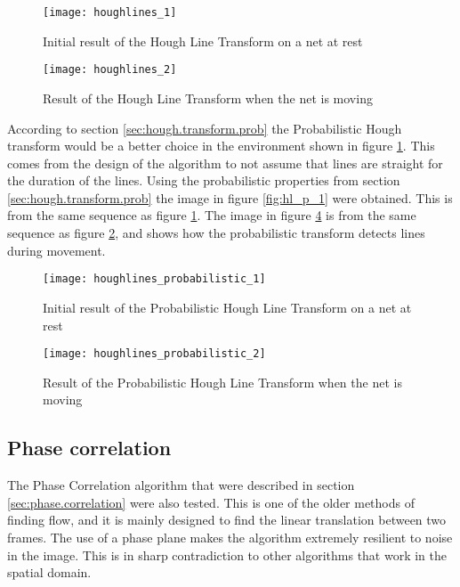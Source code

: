 \begin{figure}[htbp]
	\centering
	\texttt{[image: houghlines\_1]}
	\caption{Initial result of the Hough Line Transform on a net at rest}
	\label{fig:hl_1}
\end{figure}

\begin{figure}[htbp]
	\centering
	\texttt{[image: houghlines\_2]}
	\caption{Result of the Hough Line Transform when the net is moving}
	\label{fig:hl_2}
\end{figure}

According to section \vref{sec:hough.transform.prob} the Probabilistic Hough transform would be a better choice in the
environment shown in figure \ref{fig:hl_1}. This comes from the design of the algorithm to not 
assume that lines are straight for the duration of the lines. Using the probabilistic properties from section \ref{sec:hough.transform.prob} 
the image in figure \vref{fig:hl_p_1} were obtained. This is from the same sequence as figure \ref{fig:hl_1}. The image in figure \ref{fig:hl_p_2}
is from the same sequence as figure \ref{fig:hl_2}, and shows how the probabilistic transform detects lines during movement.

\begin{figure}[htbp]
	\centering
	\texttt{[image: houghlines\_probabilistic\_1]}
	\caption{Initial result of the Probabilistic Hough Line Transform on a net at rest}
	\label{fig:hl_p_1}
\end{figure}

\begin{figure}[htbp]
	\centering
	\texttt{[image: houghlines\_probabilistic\_2]}
	\caption{Result of the Probabilistic Hough Line Transform when the net is moving}
	\label{fig:hl_p_2}
\end{figure}

\clearpage

\subsection{Phase correlation}
The Phase Correlation algorithm that were described in section \vref{sec:phase.correlation} were also tested. This 
is one of the older methods of finding flow, and it is mainly designed to find the linear translation between two frames.
The use of a phase plane makes the algorithm extremely resilient to noise in the image. This is in sharp contradiction 
to other algorithms that work in the spatial domain.

